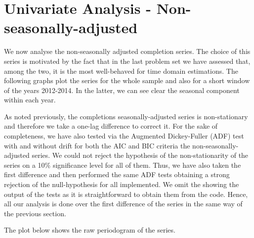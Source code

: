 \documentclass[12pt]{article} %
\begin{document}
\section{Univariate Analysis - Non-seasonally-adjusted}

We now analyse the non-seasonally adjusted completion series. The choice of this series is motivated by the fact that in the last problem set we have assessed that, among the two, it is the most well-behaved for time domain estimations. The following graphs plot the series for the whole sample and also for a short window of the years 2012-2014. In the latter, we can see clear the seasonal component within each year. 




As noted previously, the completions seasonally-adjusted series is non-stationary and therefore we take a one-lag difference to correct it. For the sake of completeness, we have also tested via the Augmented Dickey-Fuller (ADF) test with and without drift for both the AIC and BIC criteria the non-seasonally-adjusted series. We could not reject the hypothesis of the non-stationarity of the series on a 10\% significance level for all of them. Thus, we have also taken the first difference and then performed the same ADF tests obtaining a strong rejection of the null-hypothesis for all implemented. We omit the showing the output of the tests as it is straightforward to obtain them from the code. Hence, all our analysis is done over the first difference of the series in the same way of the previous section.

The plot below shows the raw periodogram of the series. 

\end{document}
